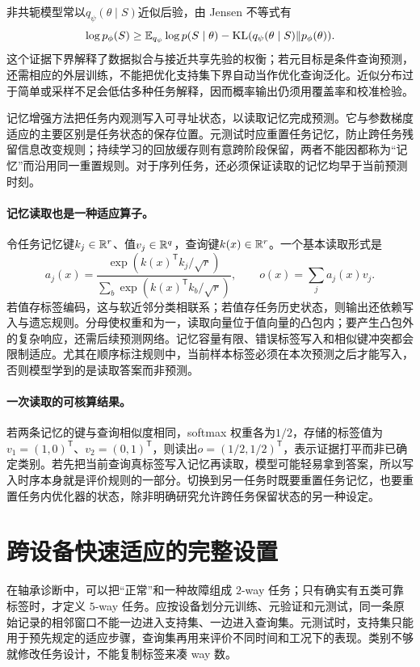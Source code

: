 非共轭模型常以$q_\psi(\theta\mid S)$近似后验，由 Jensen 不等式有
\begin{equation}
 \log p_\phi(S)\geq
 \mathbb{E}_{q_\psi}\log p(S\mid\theta)
 -\operatorname{KL}(q_\psi(\theta\mid S)\|p_\phi(\theta)).
\end{equation}
这个证据下界解释了数据拟合与接近共享先验的权衡；若元目标是条件查询预测，还需相应的外层训练，不能把优化支持集下界自动当作优化查询泛化。近似分布过于简单或采样不足会低估多种任务解释，因而概率输出仍须用覆盖率和校准检验。

记忆增强方法把任务内观测写入可寻址状态，以读取记忆完成预测。它与参数梯度适应的主要区别是任务状态的保存位置。元测试时应重置任务记忆，防止跨任务残留信息改变规则；持续学习的回放缓存则有意跨阶段保留，两者不能因都称为“记忆”而沿用同一重置规则。对于序列任务，还必须保证读取的记忆均早于当前预测时刻。

\paragraph{记忆读取也是一种适应算子。}
令任务记忆键$k_j\in\mathbb{R}^r$、值$v_j\in\mathbb{R}^q$，查询键$k(x)\in\mathbb{R}^r$。一个基本读取形式是
\begin{equation}
 a_j(x)=\frac{\exp(k(x)^{\mathsf T}k_j/\sqrt r)}
 {\sum_b\exp(k(x)^{\mathsf T}k_b/\sqrt r)},\qquad
 o(x)=\sum_ja_j(x)v_j.
\end{equation}
若值存标签编码，这与软近邻分类相联系；若值存任务历史状态，则输出还依赖写入与遗忘规则。分母使权重和为一，读取向量位于值向量的凸包内；要产生凸包外的复杂响应，还需后续预测网络。记忆容量有限、错误标签写入和相似键冲突都会限制适应。尤其在顺序标注规则中，当前样本标签必须在本次预测之后才能写入，否则模型学到的是读取答案而非预测。

\paragraph{一次读取的可核算结果。}
若两条记忆的键与查询相似度相同，softmax 权重各为$1/2$，存储的标签值为$v_1=(1,0)^{\mathsf T}$、$v_2=(0,1)^{\mathsf T}$，则读出$o=(1/2,1/2)^{\mathsf T}$，表示证据打平而非已确定类别。若先把当前查询真标签写入记忆再读取，模型可能轻易拿到答案，所以写入时序本身就是评价规则的一部分。切换到另一任务时既要重置任务记忆，也要重置任务内优化器的状态，除非明确研究允许跨任务保留状态的另一种设定。

\section{跨设备快速适应的完整设置}
在轴承诊断中，可以把“正常”和一种故障组成 $2$-way 任务；只有确实有五类可靠标签时，才定义 $5$-way 任务。应按设备划分元训练、元验证和元测试，同一条原始记录的相邻窗口不能一边进入支持集、一边进入查询集。元测试时，支持集只能用于预先规定的适应步骤，查询集再用来评价不同时间和工况下的表现。类别不够就修改任务设计，不能复制标签来凑 way 数。

